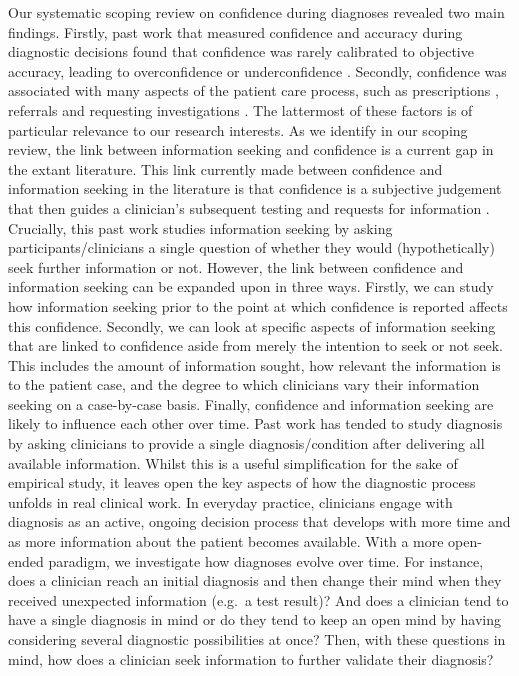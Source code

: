 \documentclass[a4paper, nobind]{templates/ociamthesis}
\begin{document}
\hfill\break
Our systematic scoping review on confidence during diagnoses revealed two main findings. Firstly, past work that measured confidence and accuracy during diagnostic decisions found that confidence was rarely calibrated to objective accuracy, leading to overconfidence \autocite{friedman_physicians_2005,fernandez-aguilar_use_2022,garbayo_metacognitive_2023} or underconfidence \autocite{mann_relationship_1993,yang_effect_2012,brezis_does_2019}. Secondly, confidence was associated with many aspects of the patient care process, such as prescriptions \autocite{levin_antimicrobial_2012,garbayo_metacognitive_2023}, referrals \autocite{calman_variability_1992} and requesting investigations \autocite{tabak_clinical_1996,gupta_associations_2023}. The lattermost of these factors is of particular relevance to our research interests. As we identify in our scoping review, the link between information seeking and confidence is a current gap in the extant literature. This link currently made between confidence and information seeking in the literature is that confidence is a subjective judgement that then guides a clinician's subsequent testing and requests for information \autocite{tabak_clinical_1996,gupta_associations_2023}.\\

Crucially, this past work studies information seeking by asking participants/clinicians a single question of whether they would (hypothetically) seek further information or not. However, the link between confidence and information seeking can be expanded upon in three ways. Firstly, we can study how information seeking prior to the point at which confidence is reported affects this confidence. Secondly, we can look at specific aspects of information seeking that are linked to confidence aside from merely the intention to seek or not seek. This includes the amount of information sought, how relevant the information is to the patient case, and the degree to which clinicians vary their information seeking on a case-by-case basis. Finally, confidence and information seeking are likely to influence each other over time. Past work has tended to study diagnosis by asking clinicians to provide a single diagnosis/condition after delivering all available information. Whilst this is a useful simplification for the sake of empirical study, it leaves open the key aspects of how the diagnostic process unfolds in real clinical work. In everyday practice, clinicians engage with diagnosis as an active, ongoing decision process that develops with more time and as more information about the patient becomes available. With a more open-ended paradigm, we investigate how diagnoses evolve over time. For instance, does a clinician reach an initial diagnosis and then change their mind when they received unexpected information (e.g.~a test result)? And does a clinician tend to have a single diagnosis in mind or do they tend to keep an open mind by having considering several diagnostic possibilities at once? Then, with these questions in mind, how does a clinician seek information to further validate their diagnosis?
\end{document}
